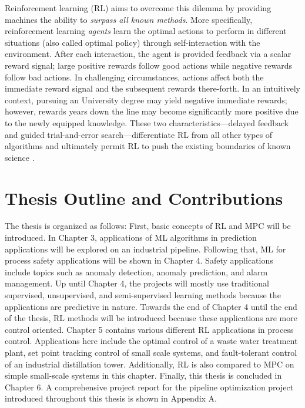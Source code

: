 Reinforcement learning (RL) aims to overcome this dilemma by providing machines the ability to \textit{surpass all known methods}.  More specifically, reinforcement learning \textit{agents} learn the optimal actions to perform in different situations (also called optimal policy) through self-interaction with the environment.  After each interaction, the agent is provided feedback via a scalar reward signal; large positive rewards follow good actions while negative rewards follow bad actions.  In challenging circumstances, actions affect both the immediate reward signal and the subsequent rewards there-forth. In an intuitively context, pursuing an University degree may yield negative immediate rewards; however, rewards years down the line may become significantly more positive due to the newly equipped knowledge.  These two characteristics---delayed feedback and guided trial-and-error search---differentiate RL from all other types of algorithms and ultimately permit RL to push the existing boundaries of known science \cite{sutton}.

\section{Thesis Outline and Contributions}
The thesis is organized as follows: First, basic concepts of RL and MPC will be introduced.  In Chapter 3, applications of ML algorithms in prediction applications will be explored on an industrial pipeline.  Following that, ML for process safety applications will be shown in Chapter 4. Safety applications include topics such as anomaly detection, anomaly prediction, and alarm management. Up until Chapter 4, the projects will mostly use traditional supervised, unsupervised, and semi-supervised learning methods because the applications are predictive in nature.  Towards the end of Chapter 4 until the end of the thesis, RL methods will be introduced because these applications are more control oriented. Chapter 5 contains various different RL applications in process control. Applications here include the optimal control of a waste water treatment plant, set point tracking control of small scale systems, and fault-tolerant control of an industrial distillation tower. Additionally, RL is also compared to MPC on simple small-scale systems in this chapter. Finally, this thesis is concluded in Chapter 6.  A comprehensive project report for the pipeline optimization project introduced throughout this thesis is shown in Appendix A.

